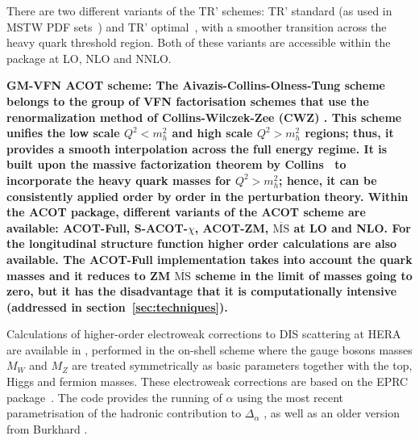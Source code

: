 \begin{description}
There are two different variants of the TR' schemes: TR' standard (as used in MSTW PDF sets~\cite{Thorne:2006qt,MSTWpdf}) 
and TR' optimal~\cite{Thorne:6180}, with a smoother transition across the heavy quark threshold region. 
Both of these variants are accessible within the \fitter package at LO, NLO and NNLO.
\vspace{0.1cm}
\item \bf {GM-VFN ACOT scheme:} \rm
The Aivazis-Collins-Olness-Tung scheme belongs to the group of VFN factorisation 
schemes that use the renormalization method of Collins-Wilczek-Zee (CWZ) \cite{CWZ}.
This scheme unifies the low scale $Q^2 < m_h^2$ and high scale $Q^2 > m_h^2$ regions; 
thus, it provides a smooth interpolation across the full energy regime. 
It is built upon the massive factorization theorem by Collins~\cite{CWZ} 
to incorporate the heavy quark masses for $Q^2 > m_h^2$; hence, it can be consistently applied 
order by order in the perturbation theory.
%
Within the ACOT package, different variants of the ACOT scheme are available:
ACOT-Full, S-ACOT-$\chi$, ACOT-ZM, $\overline{\text{MS}}$ at LO and NLO. 
For the longitudinal structure function higher order calculations are also available. 
The ACOT-Full implementation takes into account the quark masses 
and it reduces to ZM $\overline{\text{MS}}$ scheme in the limit of masses going to zero, 
but it has the disadvantage that it is computationally intensive (addressed in 
section~\ref{sec:techniques}).

\vspace{0.1cm}
\end{description}

Calculations of higher-order electroweak corrections to DIS scattering at 
HERA are available in \fitter, performed in the on-shell scheme 
where the gauge bosons masses $M_W$ and 
$M_Z$ are treated symmetrically as basic parameters together with the top, 
Higgs and fermion masses.
These electroweak corrections 
are based on the EPRC package~\cite{SpiesbergerPrivComm}.
The code provides the running of $\alpha$ using the most recent parametrisation
of the hadronic contribution to $\Delta_\alpha$ \cite{Jegerlehner}, as well as 
an older version from Burkhard \cite{Burkhard}.



